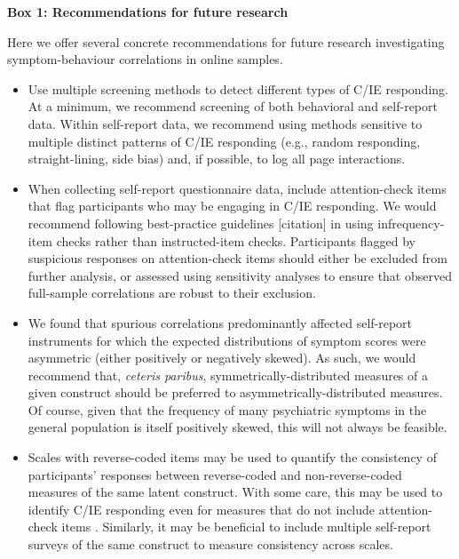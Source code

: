 \documentclass[a4paper,notitlepage,12pt]{article}
\begin{document}
\newpage
\textbf{Box 1: Recommendations for future research}

Here we offer several concrete recommendations for future research investigating symptom-behaviour correlations in online samples.

\begin{itemize}

    \item Use multiple screening methods to detect different types of C/IE responding. At a minimum, we recommend screening of both behavioral and self-report data. Within self-report data, we recommend using methods sensitive to multiple distinct patterns of C/IE responding (e.g., random responding, straight-lining, side bias) and, if possible, to log all page interactions.

    \item When collecting self-report questionnaire data, include attention-check items that flag participants who may be engaging in C/IE responding. We would recommend following best-practice guidelines [citation] in using infrequency-item checks rather than instructed-item checks. Participants flagged by suspicious responses on attention-check items should either be excluded from further analysis, or assessed using sensitivity analyses to ensure that observed full-sample correlations are robust to their exclusion.

    \item We found that spurious correlations predominantly affected self-report instruments for which the expected distributions of symptom scores were asymmetric (either positively or negatively skewed). As such, we would recommend that, \textit{ceteris paribus}, symmetrically-distributed measures of a given construct should be preferred to asymmetrically-distributed measures. Of course, given that the frequency of many psychiatric symptoms in the general population is itself positively skewed, this will not always be feasible.
    
    \item Scales with reverse-coded items may be used to quantify the consistency of participants' responses between reverse-coded and non-reverse-coded measures of the same latent construct. With some care, this may be used to identify C/IE responding even for measures that do not include attention-check items \cite{emons2009detection}. Similarly, it may be beneficial to include multiple self-report surveys of the same construct to measure consistency across scales.
    

\end{itemize}
\end{document}
